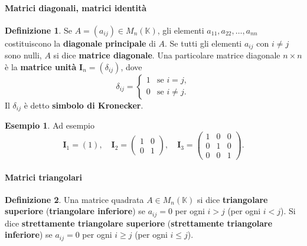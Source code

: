 \documentclass{article}
\theoremstyle{plain}
\theoremstyle{definition}
\newtheorem{defn}{Definizione}[section]
\newtheorem{exmp}{Esempio}[section]
\theoremstyle{remark}
\begin{document}
\paragraph{Matrici diagonali, matrici identità}
\begin{bxthm}
\begin{defn}
    Se \( A = (a_{ij}) \in M_n(\mathbb{K}) \), gli elementi \( a_{11}, a_{22}, \ldots, a_{nn} \) costituiscono la \textbf{diagonale principale} di \( A \). 
    Se tutti gli elementi \( a_{ij} \) con \( i \neq j \) sono nulli, \( A \) si dice \textbf{matrice diagonale}. 
    Una particolare matrice diagonale \( n \times n \) è la \textbf{matrice unità} \( \mathbf{I}_n = (\delta_{ij}) \), dove
    \[
    \delta_{ij} =
    \begin{cases}
    1 & \text{se } i = j, \\
    0 & \text{se } i \neq j.
    \end{cases}
    \]
    Il \( \delta_{ij} \) è detto \textbf{simbolo di Kronecker}.
\end{defn}
\end{bxthm}

\vspace{10pt}

\begin{exmp}
    Ad esempio
    \[
    \mathbf{I}_1 = (1), \quad \mathbf{I}_2 =
    \begin{pmatrix}
    1 & 0 \\
    0 & 1
    \end{pmatrix}, \quad \mathbf{I}_3 =
    \begin{pmatrix}
    1 & 0 & 0 \\
    0 & 1 & 0 \\
    0 & 0 & 1
    \end{pmatrix}.
    \]
\end{exmp}

\vspace{10pt}

\paragraph{Matrici triangolari}
\begin{bxthm}
\begin{defn}
    Una matrice quadrata \( A \in M_n(\mathbb{K}) \) si dice \textbf{triangolare superiore} (\textbf{triangolare inferiore}) se \( a_{ij} = 0 \) per ogni \( i > j \) (per ogni \( i < j \)). 
    Si dice \textbf{strettamente triangolare superiore} (\textbf{strettamente triangolare inferiore}) se \( a_{ij} = 0 \) per ogni \( i \geq j \) (per ogni \( i \leq j \)). 
\end{defn}
\end{bxthm}
\end{document}
